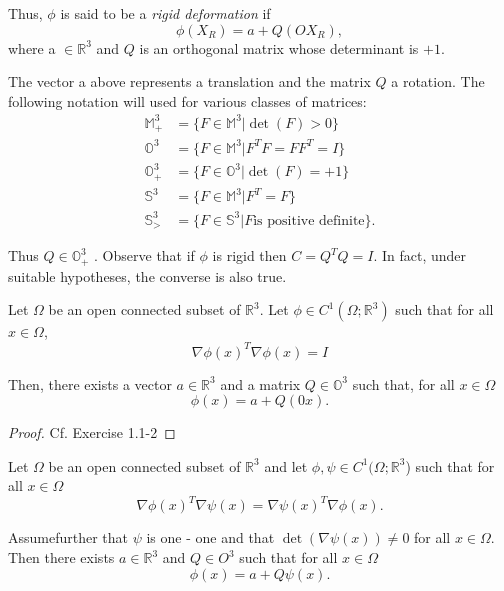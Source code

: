 Thus, $\phi$ is said to be a \textit{rigid deformation} if 
\begin{equation*}
\phi{(X_R)} = a + Q (OX_R),\tag{1.1-14}\label{eq1.1-14} 
\end{equation*}\pageoriginale 
where a $\in \mathbb{R}^3$ and $Q$ is an orthogonal matrix whose
determinant is $ + 1$. 

The vector a above represents a translation and the matrix $Q$ a
rotation. The following notation will used for various classes of
matrices: 
\begin{align*}
\mathbb{M}^3_+ & = \{F \in \mathbb{M}^3 | \det (F) > 0 \} \\
\mathbb{O}^3 & = \{F \in \mathbb{M}^3 | F^T F = FF^T = I \} \\
 \mathbb{O}^3_+ & = \{F \in \mathbb{O}^3 | \det (F) = + 1 \} \\
 \mathbb{S}^3 & =\{F \in \mathbb{M}^3 | F^T = F \} \\
 \mathbb{S}^3_> & =\{F \in \mathbb{S}^3 | F \text {is positive definite}\}. 
\end{align*}

Thus $Q \in \mathbb{O}^3_+$ . Observe that if $\phi$ is rigid then $C
= Q^T Q = I$. In fact, under suitable hypotheses, the converse is also
true. 

\begin{theorem}\label{chap1-thm1.1.2} %
	Let $\Omega$ be an open connected subset of
          $\mathbb{R}^3$. Let $\phi \in C^1 (\Omega ; \mathbb{R}^3 )$
          such that for all $x \in \Omega$, 
\begin{equation*}
\nabla  \phi (x)^T \nabla  \phi (x) = I \tag{1.1-15}\label{eq1.1-15}
\end{equation*}

Then, there exists a vector $a \in \mathbb{R}^3$ and a matrix
 $Q \in \mathbb{O}^3$ such that, for all $x \in \Omega$
\begin{equation*}
\phi (x) = a + Q(0x). \tag{1.1-16}\label{eq1.1-16}
\end{equation*}
\end{theorem}

\begin{proof}
Cf. Exercise 1.1-2
\end{proof}

\begin{theorem}\label{chap1-thm1.1.3} %
Let $\Omega$ be an open connected subset of $\mathbb{R}^3$ and let
$\phi, \psi \in C^1 (\Omega ; \mathbb{R}^3$) such that for all $x \in
\Omega$ 
\begin{equation*}
\nabla  \phi (x)^T \nabla  \psi (x) = \nabla
\psi (x)^T \nabla  \phi (x). \tag{1.1-17} \label{eq1.1-17}
\end{equation*}

 Assume\pageoriginale  further that $\psi$ is one - one and that $\det (\nabla
 \psi(x)) \neq 0$ for all $x \in \Omega$. Then there exists $a \in
 \mathbb{R}^3$ and $Q \in O^3$ such that for all $x \in \Omega$ 
\begin{equation*}
\phi (x) = a + Q \psi (x). \tag{1.1-18}\label{eq1.1-18}
\end{equation*}
\end{theorem}

